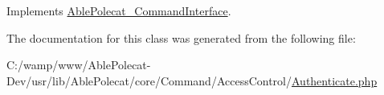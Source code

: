 Implements \hyperlink{interface_able_polecat___command_interface_a6821480fe527af0afdf3691d7cffad5f}{Able\+Polecat\+\_\+\+Command\+Interface}.



The documentation for this class was generated from the following file\+:\begin{DoxyCompactItemize}
\item 
C\+:/wamp/www/\+Able\+Polecat-\/\+Dev/usr/lib/\+Able\+Polecat/core/\+Command/\+Access\+Control/\hyperlink{_command_2_access_control_2_authenticate_8php}{Authenticate.\+php}\end{DoxyCompactItemize}
